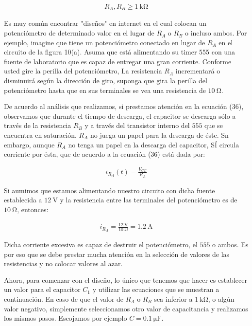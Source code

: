 \documentclass{article}
\begin{document}
\begin{align}
	R_A, R_B \geq \qty{1}{\kilo \ohm} \nonumber
\end{align}

Es muy común encontrar "diseños" en internet en el cual colocan un potenciómetro de determinado valor en el lugar de $R_A$ o $R_B$ o incluso ambos. Por ejemplo, imagine que tiene un potenciómetro conectado en lugar de $R_A$ en el circuito de la figura 10(a). Asuma que está alimentando su timer 555 con una fuente de laboratorio que es capaz de entregar una gran corriente. Conforme usted gire la perilla del potenciómetro, La resistencia $R_A$ incrementará o disminuirá según la dirección de giro, suponga que gira la perilla del potenciómetro hasta que en sus terminales se vea una resistencia de $\qty{10}{\ohm}$.

De acuerdo al análisis que realizamos, si prestamos atención en la ecuación (36), observamos que durante el tiempo de descarga, el capacitor se descarga sólo a través de la resistencia $R_B$ y a través del transistor interno del $555$ que se encuentra en saturación. $R_A$ no juega un papel para la descarga de éste. Sn embargo, aunque $R_A$ no tenga un papel en la descarga del capacitor, SÍ circula corriente por ésta, que de acuerdo a la ecuación (36) está dada por:

\begin{align}
	i_{R_A}(t) = \frac{V_{CC}}{R_A} \nonumber
\end{align} 

Si aumimos que estamos alimentando nuestro circuito con dicha fuente establecida a $\qty{12}{\volt}$ y la resistencia entre las terminales del potenciómetro es de $\qty{10}{\ohm}$, entonces:

\begin{align}
	i_{R_A} = \frac{\qty{12}{\volt}}{\qty{10}{\ohm}} = \qty{1.2}{\ampere} \nonumber
\end{align}

Dicha corriente excesiva es capaz de destruir el potenciómetro, el $555$ o ambos. Es por eso que se debe prestar mucha atención en la selección de valores de las resistencias y no colocar valores al azar.

Ahora, para comenzar con el diseño, lo único que tenemos que hacer es establecer un valor para el capacitor $C_1$ y utilizar las ecuaciones que se muestran a continuación. En caso de que el valor de $R_A$ o $R_B$ sea inferior a $\qty{1}{\kilo \ohm}$, o algún valor negativo, simplemente seleccionamos otro valor de capacitancia y realizamos los mismos pasos. Escojamos por ejemplo $C=\qty{0.1}{\micro \farad}$. \\
\end{document}
